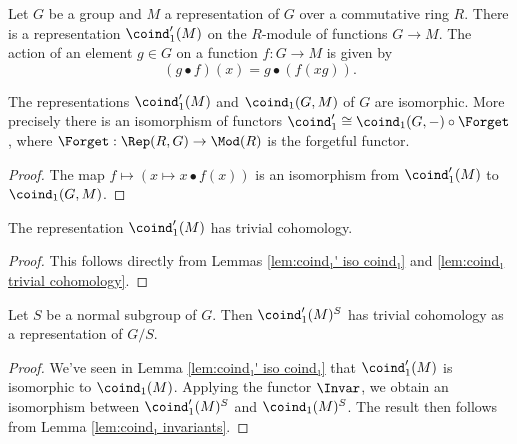 \begin{definition} \label{def:coind₁'}
	\leanok
	Let $G$ be a group and $M$ a representation of $G$ over a commutative ring $R$.
	There is a representation $\coind_1' (M)$ on the $R$-module of
	functions $G \to M$.
	The action of an element $g \in G$ on a function $f : G \to M$ is given by
	\[
		(g \bullet f)(x) = g \bullet (f (xg)).
	\]
\end{definition}

\begin{lemma}	\label{lem:coind₁' iso coind₁}
	\leanok
	The representations $\coind_1'(M)$ and $\coind_1(G,M)$ of $G$ are isomorphic.
	More precisely there is an isomorphism of functors
	$\coind_1' \cong \coind_1(G,-) \circ \Forget$, where $\Forget : \Rep(R,G) \to \Mod(R)$
	is the forgetful functor.
\end{lemma}

\begin{proof}
	The map $f \mapsto (x \mapsto x \bullet f(x))$ is an isomorphism
	from $\coind_1'(M)$ to $\coind_1(G,M)$.
\end{proof}

\begin{corollary}	\label{cor:coind₁' trivial cohomology}
	\leanok
	The representation $\coind_1'(M)$ has trivial cohomology.
\end{corollary}

\begin{proof}
	This follows directly from Lemmas \ref{lem:coind₁' iso coind₁}
	and \ref{lem:coind₁ trivial cohomology}.
	\leanok
\end{proof}

\begin{corollary}	\label{cor:coind₁' invariants trivial cohomology}
	Let $S$ be a normal subgroup of $G$. Then $\coind_1'(M)^S$ has trivial cohomology as a
	representation of $G/S$.
\end{corollary}

\begin{proof}
	We've seen in Lemma \ref{lem:coind₁' iso coind₁} that $\coind_1'(M)$
	is isomorphic to $\coind_1(M)$.
	Applying the functor $\Invar$, we obtain an isomorphism between $\coind_1'(M)^S$ and $\coind_1(M)^S$.
	The result then follows from Lemma \ref{lem:coind₁ invariants}.
\end{proof}

